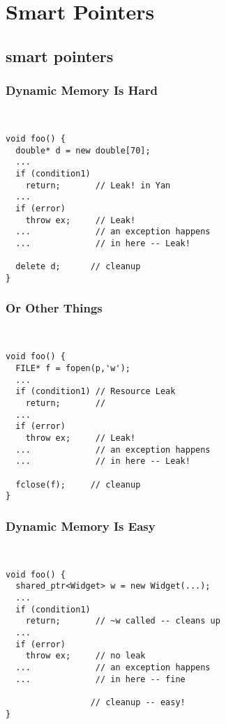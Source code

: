 \section[Smart Pointers]{Smart Pointers}
\subsection{smart pointers}

\begin{frame}[fragile,t]
\frametitle{Dynamic Memory Is Hard}
{\scriptsize\
\begin{verbatim}
void foo() {
  double* d = new double[70];
  ...
  if (condition1)
    return;       // Leak! in Yan 
  ...
  if (error)
    throw ex;     // Leak!
  ...             // an exception happens
  ...             // in here -- Leak!

  delete d;      // cleanup
}
\end{verbatim}
}
\end{frame}

\begin{frame}[fragile,t]
\frametitle{Or Other Things}
{\scriptsize\
\begin{verbatim}
void foo() {
  FILE* f = fopen(p,'w');    
  ...
  if (condition1) // Resource Leak
    return;       // 
  ...
  if (error)
    throw ex;     // Leak!
  ...             // an exception happens
  ...             // in here -- Leak!

  fclose(f);     // cleanup
}
\end{verbatim}
}
\pause
\center{ \textcolor{purple} {Mutexes?  Run Away!}}

\end{frame}

\begin{frame}[fragile,t]
\frametitle{Dynamic Memory Is Easy}
{\scriptsize\
\begin{verbatim}
void foo() {
  shared_ptr<Widget> w = new Widget(...);
  ...
  if (condition1)
    return;       // ~w called -- cleans up
  ...
  if (error)
    throw ex;     // no leak
  ...             // an exception happens
  ...             // in here -- fine

                 // cleanup -- easy!
}
\end{verbatim}
}
\end{frame}




